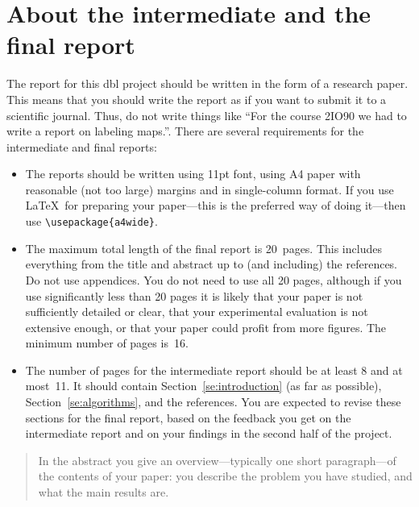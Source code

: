 \documentclass[11pt]{article}
\begin{document}
\section*{About the intermediate and the final report}
The report for this {\sc dbl} project should be written in the form of a research paper.
This means that you should write the report as if you want to submit it to a scientific
journal. Thus, do not write things like ``For the course 2IO90 we had to write a report
on labeling maps.''. There are several requirements for
the intermediate and final reports:
\begin{itemize}
\item The reports should be written using 11\;pt font, using A4 paper
      with reasonable (not too large) margins and in single-column format. If you use \LaTeX\ for preparing
      your paper---this is the preferred way of doing it---then use
      \verb#\usepackage{a4wide}#.
\item The maximum total length of the
      final report is 20~pages. This includes everything from the title and abstract up
      to (and including) the references. Do not use appendices.
      You do not need to use all 20 pages,
      although if you use significantly less than 20 pages it is likely that
      your paper is not sufficiently detailed or clear, that your experimental evaluation is
      not extensive enough, or that your paper could profit from more figures.
      The minimum number of pages is~16.
\item The number of pages for the intermediate report should be at least 8 and at most~11.
      It should contain Section~\ref{se:introduction} (as far as possible), Section~\ref{se:algorithms},
      and the references. You are expected to revise these sections for the final report, based
      on the feedback you get on the intermediate report and on your findings in the second half
      of the project.
\end{itemize}





\newpage

\maketitle

\begin{abstract}
In the abstract you give an overview---typically one short paragraph---of the contents of
your paper: you describe the problem you have studied, and what the main results are.
\end{abstract}
\end{document}

